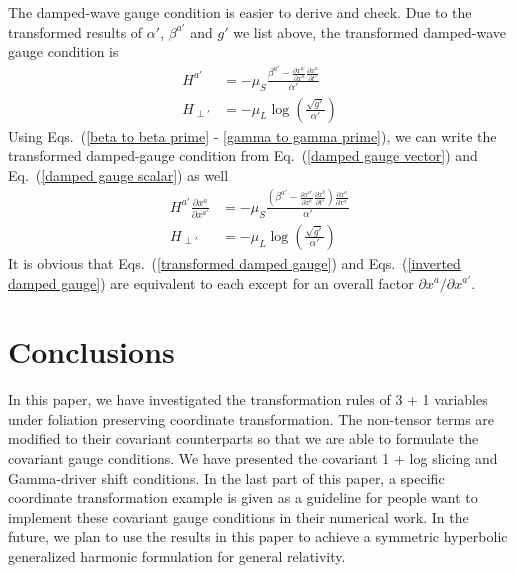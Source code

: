 \documentclass[letterpaper,nofootinbib,prd,amsmath,onecolumn]{revtex4-1}
\begin{document}
The damped-wave gauge condition is easier to derive and check. Due to the transformed results of $\alpha'$, $\beta^{a'}$ and $g'$ we list above, the transformed damped-wave gauge condition is
\begin{subequations}\label{transformed damped gauge}
\begin{align}
H^{a'} & = -\mu_{S}\frac{\beta^{a'} - \frac{\partial x^{a'}}{\partial x^{a}}\frac{\partial x^{a}}{\partial t'}}{\alpha'}\\
H_{\perp'} & = -\mu_{L}\log\left(\frac{\sqrt{g'}}{\alpha'}\right)
\end{align}
\end{subequations}
Using Eqs.~(\ref{beta to beta prime} - \ref{gamma to gamma prime}), we can write the transformed damped-gauge condition from Eq.~(\ref{damped gauge vector}) and Eq.~(\ref{damped gauge scalar}) as well
\begin{subequations}\label{inverted damped gauge}
\begin{align}
H^{a'}\frac{\partial x^{a}}{\partial x^{a'}} & = - \mu_{S}\frac{\left( \beta^{a'} - \frac{\partial x^{a'}}{\partial x^{b}}\frac{\partial x^{b}}{\partial t'}\right)\frac{\partial x^{a}}{\partial x^{a'}}}{\alpha'}\\
H_{\perp'} & = - \mu_{L}\log\left(\frac{\sqrt{g'}}{\alpha'}\right)
\end{align}
\end{subequations}
It is obvious that Eqs.~(\ref{transformed damped gauge}) and Eqs.~(\ref{inverted damped gauge}) are equivalent to each except for an overall factor $\partial x^{a}/\partial x^{a'}$. 
\section{Conclusions}
In this paper, we have investigated the transformation rules of 3 + 1 variables under foliation preserving coordinate transformation. The non-tensor terms are modified to their covariant counterparts so that we are able to formulate the covariant gauge conditions. We have presented the covariant 1 + log slicing and Gamma-driver shift conditions. In the last part of this paper, a specific coordinate transformation example is given as a guideline for people want to implement these covariant gauge conditions in their numerical work. In the future, we plan to use the results in this paper to achieve a symmetric hyperbolic generalized harmonic formulation for general relativity.  



\end{document}
